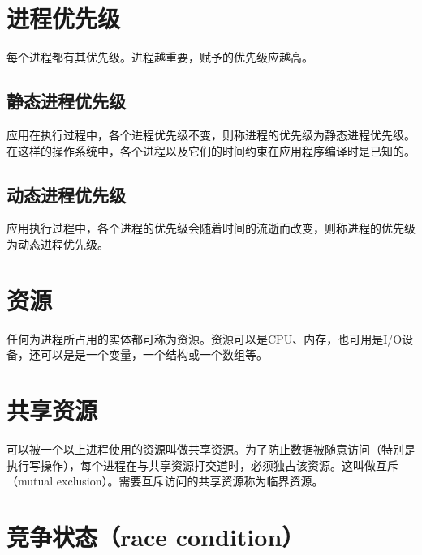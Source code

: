 \documentclass[a4paper,12pt]{report}
\begin{document}
\begin{appendix}
\section{ 进程优先级}
\begin{spacing}{1.5}

       每个进程都有其优先级。进程越重要，赋予的优先级应越高。

\end{spacing}
\subsection{静态进程优先级}
   \begin{spacing}{1.5}
     应用在执行过程中，各个进程优先级不变，则称进程的优先级为静态进程优先级。在这样的操作系统中，各个进程以及它们的时间约束在应用程序编译时是已知的。
     \end{spacing}
\subsection{动态进程优先级}
   \begin{spacing}{1.5}
      应用执行过程中，各个进程的优先级会随着时间的流逝而改变，则称进程的优先级为动态进程优先级。
     \end{spacing}
\section{ 资源}
\begin{spacing}{1.5}

       任何为进程所占用的实体都可称为资源。资源可以是CPU、内存，也可用是I/O设备，还可以是是一个变量，一个结构或一个数组等。

\end{spacing}
\section{ 共享资源}
\begin{spacing}{1.5}

        可以被一个以上进程使用的资源叫做共享资源。为了防止数据被随意访问（特别是执行写操作），每个进程在与共享资源打交道时，必须独占该资源。这叫做互斥（mutual exclusion）。需要互斥访问的共享资源称为临界资源。

\end{spacing}


\section{        竞争状态（race  condition）}
\begin{spacing}{1.5}



\end{spacing}
\end{appendix}
\end{document}
